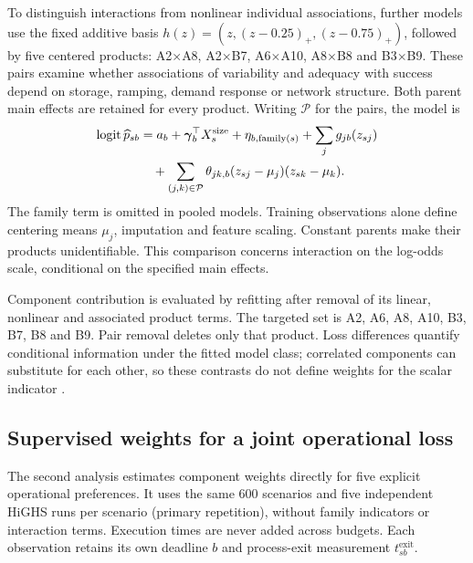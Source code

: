 To distinguish interactions from nonlinear individual associations, further
models use the fixed additive basis
$h(z)=(z,(z-0.25)_+,(z-0.75)_+)$, followed by five centered products:
A2$\times$A8, A2$\times$B7, A6$\times$A10, A8$\times$B8 and B3$\times$B9.
These pairs examine whether associations of variability and adequacy with
success depend on storage, ramping, demand response or network structure.
Both parent main effects are retained for every product. Writing
$\mathcal P$ for the pairs, the model is
\begin{equation}
 \begin{aligned}
 \operatorname{logit}\widehat p_{sb}
 &=a_b+\boldsymbol\gamma_b^\top X_s^{\rm size}
 +\eta_{b,\mathrm{family}(s)}+\sum_j g_{jb}(z_{sj})\\
 &\quad+\sum_{(j,k)\in\mathcal P}\theta_{jk,b}
 (z_{sj}-\mu_j)(z_{sk}-\mu_k).
 \end{aligned}
 \label{eq:targeted_interactions}
\end{equation}
The family term is omitted in pooled models. Training observations alone
define centering means $\mu_j$, imputation and feature scaling. Constant
parents make their products unidentifiable. This comparison concerns
interaction on the log-odds scale, conditional on the specified main effects.

Component contribution is evaluated by refitting after removal of its
linear, nonlinear and associated product terms. The targeted set is A2,
A6, A8, A10, B3, B7, B8 and B9. Pair removal deletes only that product.
Loss differences quantify conditional information under the fitted model
class; correlated components can substitute for each other, so these
contrasts do not define weights for the scalar indicator \citep{fisher2019}.

\subsection{Supervised weights for a joint operational loss}
\label{sec:p1_weight_method}
The second analysis estimates component weights directly for five
explicit operational preferences. It uses the same 600 scenarios and five
independent HiGHS runs per scenario (primary repetition), without family
indicators or interaction terms. Execution times are never added across
budgets. Each observation retains its own deadline $b$ and process-exit
measurement $t^{\mathrm{exit}}_{sb}$.

